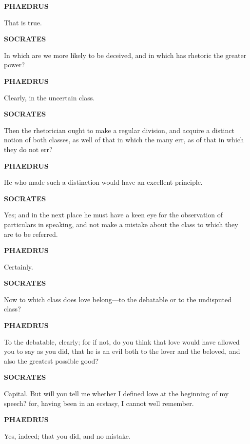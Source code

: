 \documentclass[11pt,letter]{article}
\begin{document}
\par \textbf{PHAEDRUS}
\par   That is true.

\par \textbf{SOCRATES}
\par   In which are we more likely to be deceived, and in which has rhetoric the greater power?

\par \textbf{PHAEDRUS}
\par   Clearly, in the uncertain class.

\par \textbf{SOCRATES}
\par   Then the rhetorician ought to make a regular division, and acquire a distinct notion of both classes, as well of that in which the many err, as of that in which they do not err?

\par \textbf{PHAEDRUS}
\par   He who made such a distinction would have an excellent principle.

\par \textbf{SOCRATES}
\par   Yes; and in the next place he must have a keen eye for the observation of particulars in speaking, and not make a mistake about the class to which they are to be referred.

\par \textbf{PHAEDRUS}
\par   Certainly.

\par \textbf{SOCRATES}
\par   Now to which class does love belong—to the debatable or to the undisputed class?

\par \textbf{PHAEDRUS}
\par   To the debatable, clearly; for if not, do you think that love would have allowed you to say as you did, that he is an evil both to the lover and the beloved, and also the greatest possible good?

\par \textbf{SOCRATES}
\par   Capital. But will you tell me whether I defined love at the beginning of my speech? for, having been in an ecstasy, I cannot well remember.

\par \textbf{PHAEDRUS}
\par   Yes, indeed; that you did, and no mistake.
\end{document}
